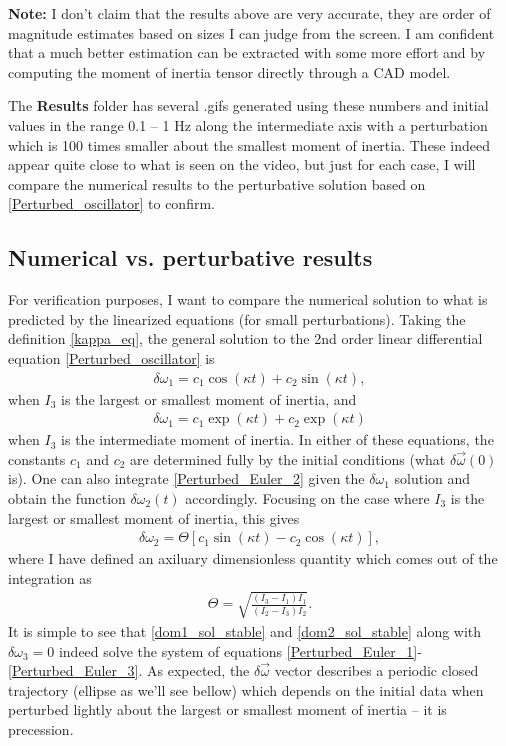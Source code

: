 \documentclass[a4paper]{article}
\begin{document}
	\noindent \textbf{Note:} I don't claim that the results above are very accurate, they are order of magnitude estimates based on sizes I can judge from the screen.
	I am confident that a much better estimation can be extracted with some more effort and by computing the moment of inertia tensor directly through a CAD model.

	The \textbf{Results} folder has several .gifs generated using these numbers and initial values in the range 0.1 -- 1 Hz along the intermediate axis with a perturbation which is 100 times smaller about the smallest moment of inertia.
	These indeed appear quite close to what is seen on the video, but just for each case, I will compare the numerical results to the perturbative solution based on \eqref{Perturbed_oscillator} to confirm.

	\subsection{Numerical vs. perturbative results}
	For verification purposes, I want to compare the numerical solution to what is predicted by the linearized equations (for small perturbations).
	Taking the definition \eqref{kappa_eq}, the general solution to the 2nd order linear differential equation \eqref{Perturbed_oscillator} is 
	\begin{eqnarray}\label{dom1_sol_stable}
		\delta \omega_1 = c_1 \cos( \kappa t ) + c_2 \sin( \kappa t ),
	\end{eqnarray} 
	when $I_3$ is the largest or smallest moment of inertia, and 
	\begin{eqnarray}\label{dom1_sol_unstable}
		\delta \omega_1 = c_1 \exp( \kappa t ) + c_2 \exp( \kappa t )
	\end{eqnarray}
	when $I_3$ is the intermediate moment of inertia.
	In either of these equations, the constants $c_1$ and $c_2$ are determined fully by the initial conditions (what $\delta \vec{\omega}(0)$ is).
	One can also integrate \eqref{Perturbed_Euler_2} given the $\delta \omega_1$ solution and obtain the function $\delta \omega_2(t)$ accordingly.
	Focusing on the case where $I_3$ is the largest or smallest moment of inertia, this gives 
	\begin{eqnarray}\label{dom2_sol_stable}
		\delta \omega_2 = \Theta \left[ c_1 \sin( \kappa t ) - c_2 \cos( \kappa t ) \right],
	\end{eqnarray}
	where I have defined an axiluary dimensionless quantity which comes out of the integration as
	\begin{eqnarray}
		\Theta = \sqrt{ \frac{ (I_3 - I_1) I_1 }{ ( I_2 - I_3 ) I_2 } }.
	\end{eqnarray}
	It is simple to see that \eqref{dom1_sol_stable} and \eqref{dom2_sol_stable} along with $\delta \omega_3 = 0$ indeed solve the system of equations \eqref{Perturbed_Euler_1}-\eqref{Perturbed_Euler_3}.
	As expected, the $\delta \vec{\omega}$ vector describes a periodic closed trajectory (ellipse as we'll see bellow) which depends on the initial data when perturbed lightly about the largest or smallest moment of inertia -- it is precession.
	
\end{document}
